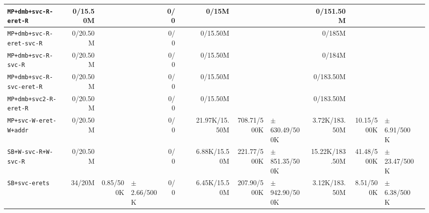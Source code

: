 \begin{tabular}{l  | r r l | r r l | r r l | r r l l}
       \verb|MP+dmb+svc-R-eret-R| &       0/15.50M &                       &                 &            0/0 &                       &  &          0/15M &                       &                   &      0/151.50M &                       &                  & \\ \hline 
   \verb|MP+dmb+svc-R-eret-svc-R| &       0/20.50M &                       &                 &            0/0 &                       &  &       0/15.50M &                       &                   &         0/185M &                       &                  & \\ \hline 
        \verb|MP+dmb+svc-R-svc-R| &       0/20.50M &                       &                 &            0/0 &                       &  &       0/15.50M &                       &                   &         0/184M &                       &                  & \\ \hline 
   \verb|MP+dmb+svc-R-svc-eret-R| &       0/20.50M &                       &                 &            0/0 &                       &  &       0/15.50M &                       &                   &      0/183.50M &                       &                  & \\ \hline 
      \verb|MP+dmb+svc2-R-eret-R| &       0/20.50M &                       &                 &            0/0 &                       &  &       0/15.50M &                       &                   &      0/183.50M &                       &                  & \\ \hline 
      \verb|MP+svc-W-eret-W+addr| &       0/20.50M &                       &                 &            0/0 &                       &  &  21.97K/15.50M &           708.71/500K & $\pm$ 630.49/500K &  3.72K/183.50M &            10.15/500K &  $\pm$ 6.91/500K & \\ \hline 
        \verb|SB+W-svc-R+W-svc-R| &       0/20.50M &                       &                 &            0/0 &                       &  &   6.88K/15.50M &           221.77/500K & $\pm$ 851.35/500K & 15.22K/183.50M &            41.48/500K & $\pm$ 23.47/500K & \\ \hline 
              \verb|SB+svc-erets| &         34/20M &             0.85/500K & $\pm$ 2.66/500K &            0/0 &                       &  &   6.45K/15.50M &           207.90/500K & $\pm$ 942.90/500K &  3.12K/183.50M &             8.51/500K &  $\pm$ 6.38/500K & \\ \hline 
\end{tabular}

